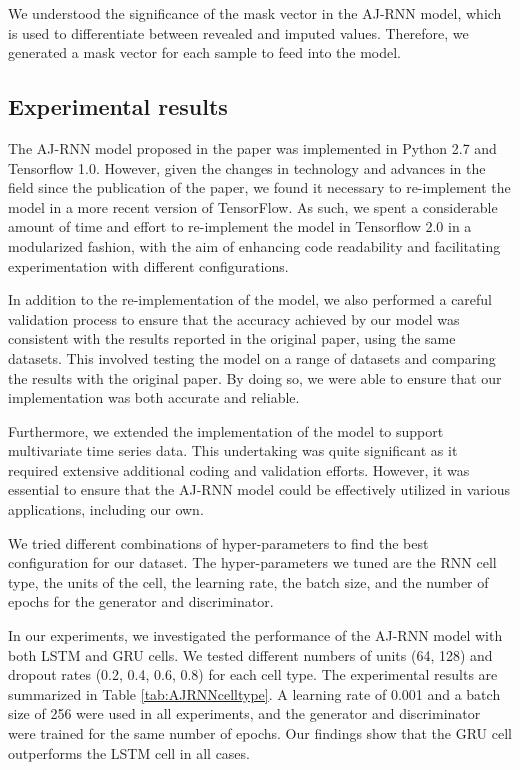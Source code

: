 We understood the significance of the mask vector in the AJ-RNN model, which is used to differentiate between revealed and imputed values.
Therefore, we generated a mask vector for each sample to feed into the model.

\subsection{Experimental results}

The AJ-RNN model proposed in the paper was implemented in Python 2.7 and Tensorflow 1.0.
However, given the changes in technology and advances in the field since the publication of the paper, we found it necessary to re-implement the model in a more recent version of TensorFlow.
As such, we spent a considerable amount of time and effort to re-implement the model in Tensorflow 2.0 in a modularized fashion, with the aim of enhancing code readability and facilitating experimentation with different configurations.

In addition to the re-implementation of the model, we also performed a careful validation process to ensure that the accuracy achieved by our model was consistent with the results reported in the original paper, using the same datasets. 
This involved testing the model on a range of datasets and comparing the results with the original paper. 
By doing so, we were able to ensure that our implementation was both accurate and reliable.

Furthermore, we extended the implementation of the model to support multivariate time series data. 
This undertaking was quite significant as it required extensive additional coding and validation efforts. 
However, it was essential to ensure that the AJ-RNN model could be effectively utilized in various applications, including our own.


We tried different combinations of hyper-parameters to find the best configuration for our dataset.
The hyper-parameters we tuned are the RNN cell type, the units of the cell, the learning rate, the batch size, and the number of epochs for the generator and discriminator.

In our experiments, we investigated the performance of the AJ-RNN model with both LSTM and GRU cells. 
We tested different numbers of units (64, 128) and dropout rates (0.2, 0.4, 0.6, 0.8) for each cell type. 
The experimental results are summarized in Table \ref{tab:AJRNNcelltype}. 
A learning rate of 0.001 and a batch size of 256 were used in all experiments, and the generator and discriminator were trained for the same number of epochs. 
Our findings show that the GRU cell outperforms the LSTM cell in all cases.

